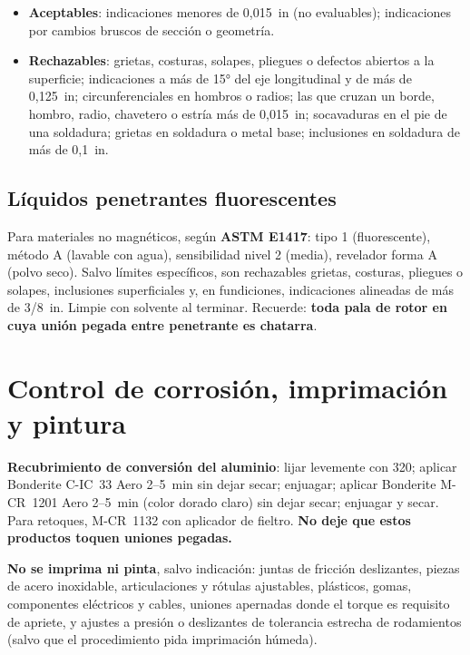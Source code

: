 \begin{itemize}
\item \textbf{Aceptables}: indicaciones menores de 0,015~in (no evaluables); indicaciones por cambios bruscos de sección o geometría.
\item \textbf{Rechazables}: grietas, costuras, solapes, pliegues o defectos abiertos a la superficie; indicaciones a más de 15° del eje longitudinal y de más de 0,125~in; circunferenciales en hombros o radios; las que cruzan un borde, hombro, radio, chavetero o estría más de 0,015~in; socavaduras en el pie de una soldadura; grietas en soldadura o metal base; inclusiones en soldadura de más de 0,1~in.
\end{itemize}

\subsection{Líquidos penetrantes fluorescentes}

Para materiales no magnéticos, según \textbf{ASTM E1417}: tipo 1 (fluorescente), método A (lavable con agua), sensibilidad nivel 2 (media), revelador forma A (polvo seco). Salvo límites específicos, son rechazables grietas, costuras, pliegues o solapes, inclusiones superficiales y, en fundiciones, indicaciones alineadas de más de 3/8~in. Limpie con solvente al terminar. Recuerde: \textbf{toda pala de rotor en cuya unión pegada entre penetrante es chatarra}.

\section{Control de corrosión, imprimación y pintura}

\textbf{Recubrimiento de conversión del aluminio}: lijar levemente con 320; aplicar Bonderite C-IC~33 Aero 2--5~min sin dejar secar; enjuagar; aplicar Bonderite M-CR~1201 Aero 2--5~min (color dorado claro) sin dejar secar; enjuagar y secar. Para retoques, M-CR~1132 con aplicador de fieltro. \textbf{No deje que estos productos toquen uniones pegadas.}

\textbf{No se imprima ni pinta}, salvo indicación: juntas de fricción deslizantes, piezas de acero inoxidable, articulaciones y rótulas ajustables, plásticos, gomas, componentes eléctricos y cables, uniones apernadas donde el torque es requisito de apriete, y ajustes a presión o deslizantes de tolerancia estrecha de rodamientos (salvo que el procedimiento pida imprimación húmeda).

